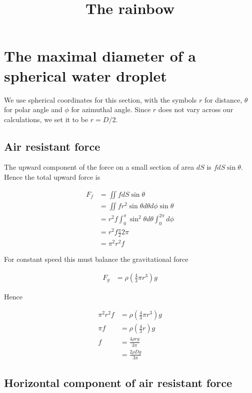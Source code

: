 \documentclass{article}
\title{The rainbow}
\date{}
\begin{document}
\maketitle

\section{The maximal diameter of a spherical water droplet}

We use spherical coordinates for this section, with the symbols $r$ for distance, $\theta$ for polar angle and $\phi$ for azimuthal angle. Since $r$ does not vary across our calculations, we set it to be $r = D/2$.

\subsection{Air resistant force}

The upward component of the force on a small section of area $dS$ is $f dS \sin \theta$. Hence the total upward force is

\begin{align*}
F_f &= \iint f dS \sin \theta \\
&= \iint f r^2 \sin\theta d\theta d\phi \sin\theta \\
&= r^2 f \int_0^\pi \sin^2 \theta d\theta \int_0^{2\pi} d\phi \\
&= r^2 f \frac{\pi}{2} 2\pi \\
&= \pi^2 r^2 f
\end{align*}

For constant speed this must balance the gravitational force

\begin{align*}
F_g &= \rho (\frac{4}{3} \pi r^3) g
\end{align*}

Hence

\begin{align*}
\pi^2 r^2 f &= \rho (\frac{4}{3} \pi r^3) g \\
\pi f &= \rho (\frac{4}{3} r) g \\
f &= \frac{4 \rho r g}{3\pi} \\
&= \frac{2 \rho D g}{3\pi}
\end{align*}

\subsection{Horizontal component of air resistant force}
\end{document}
